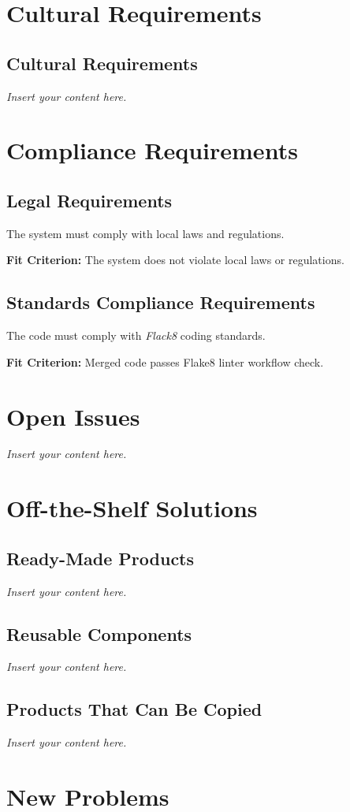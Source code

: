\documentclass[12pt]{article}
\newcommand{\lips}{\textit{Insert your content here.}}
\begin{document}
\section{Cultural Requirements}
\subsection{Cultural Requirements}
\lips

\section{Compliance Requirements}
\subsection{Legal Requirements}
The system must comply with local laws and regulations.

\textbf{Fit Criterion:} The system does not violate local laws or regulations.
\subsection{Standards Compliance Requirements}
The code must comply with \textit{Flack8} coding standards.

\textbf{Fit Criterion:} Merged code passes Flake8 linter workflow check.

\section{Open Issues}
\lips

\section{Off-the-Shelf Solutions}
\subsection{Ready-Made Products}
\lips
\subsection{Reusable Components}
\lips
\subsection{Products That Can Be Copied}
\lips

\section{New Problems}
\end{document}
